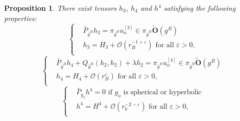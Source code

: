 \documentclass[11pt,reqno]{amsart}
\numberwithin{equation}{section}
\newtheorem{prop}[thm]{Proposition}
\theoremstyle{definition}
\theoremstyle{remark}
\begin{document}
\begin{prop}\label{prop:extension tensors}
    There exist tensors $h_3$, $h_4$ and $h^4$ satisfying the following properties:
    \begin{equation}\label{eq: ext cubic terms}
        \left\{\begin{aligned}
            &\bar{P}_{\bar{g}^B}h_3={\pi_{\bar{g}^B}}u_o^{[3]}\in {\pi_{\bar{g}^B}}\tilde{\mathbf{O}}(g^B)\\
            &h_3 = H_3 +  \mathcal{O}(r_B^{-1+\varepsilon}) \text{ for all $\varepsilon>0$,}\\
        \end{aligned}\right.
    \end{equation}
    \begin{equation}\label{eq: ext quartic terms}
        \left\{\begin{aligned}
            &\bar{P}_{\bar{g}^B}h_4 + Q_{\bar{g}^B}(h_2,h_2)+\lambda h_2 ={\pi_{\bar{g}^B}}u_o^{[4]} \in {\pi_{\bar{g}^B}}\tilde{\mathbf{O}}(g^B)\\
            &h_4 = H_4 + \mathcal{O}(r_B^{\varepsilon}) \text{ for all $\varepsilon>0$,}\\
        \end{aligned}\right.
    \end{equation}
\begin{equation}\label{eq: ext terms infty}
        \left\{\begin{aligned}
            &\bar{P}_{g_o}h^4 =0 \text{ if }g_o \text{ is spherical or hyperbolic}\\
            &h^4 = H^4 + \mathcal{O}(r_b^{-2-\varepsilon}) \text{ for all $\varepsilon>0$,}\\
        \end{aligned}\right.
    \end{equation}
\end{prop}
\end{document}

